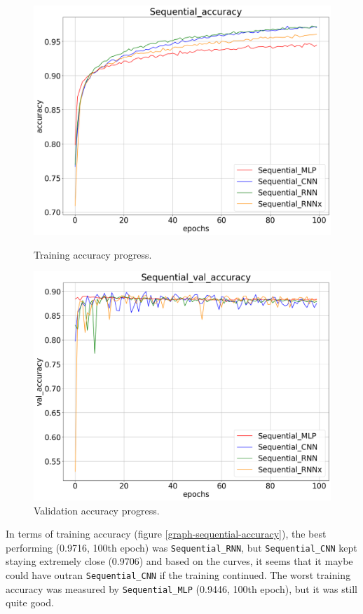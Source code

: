 \begin{figure}[!h]
    \centering
    \begin{minipage}{0.48\textwidth}
        \centering
        \includegraphics[width=\linewidth]{obrazky-figures/Sequential_experiment/accuracy_2023-03-29_14:45:07.png}
        \caption{Training accuracy progress.}
        \label{graph-sequential-accuracy}
    \end{minipage}\hfill
    \begin{minipage}{0.48\textwidth}
        \centering
        \includegraphics[width=\linewidth]{obrazky-figures/Sequential_experiment/val_accuracy_2023-03-29_14:45:07.png}
        \caption{Validation accuracy progress.}
        \label{graph-sequential-val_accuracy}
    \end{minipage}
\end{figure}
In terms of training accuracy (figure \ref{graph-sequential-accuracy}), the best performing (0.9716, 100th epoch) was
\texttt{Sequential\_RNN}, but \texttt{Sequential\_CNN} kept staying extremely close (0.9706) and based on the curves,
it seems that it maybe could have outran \texttt{Sequential\_CNN} if the training continued.
The worst training accuracy was measured by \texttt{Sequential\_MLP} (0.9446, 100th epoch), but it was still quite good.

